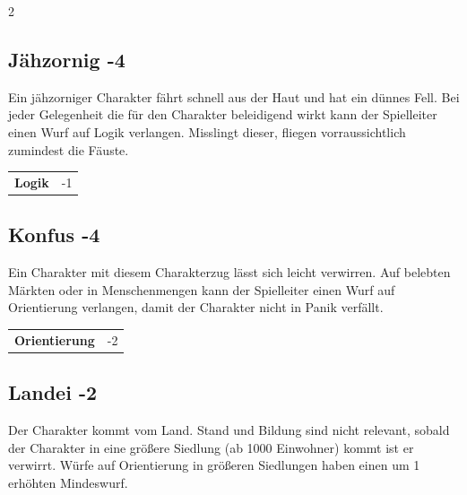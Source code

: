 \begin{multicols}{2}
\begin{tcolorbox}
    \subsection*{Jähzornig \hfill \small{-4 }}
    \tcblower
Ein jähzorniger Charakter fährt schnell aus der Haut und hat ein dünnes Fell. Bei jeder Gelegenheit die für den Charakter beleidigend wirkt kann der Spielleiter einen Wurf auf Logik verlangen. Misslingt dieser, fliegen vorraussichtlich zumindest die Fäuste.


\vspace{3mm}

\begin{tabular}{@{}ll@{}}
    \textbf{Logik} & -1\\
\end{tabular}


\end{tcolorbox}

\begin{tcolorbox}
    \subsection*{Konfus \hfill \small{-4 }}
    \tcblower
Ein Charakter mit diesem Charakterzug lässt sich leicht verwirren. Auf belebten Märkten oder in Menschenmengen kann der Spielleiter einen Wurf auf Orientierung verlangen, damit der Charakter nicht in Panik verfällt.


\vspace{3mm}

\begin{tabular}{@{}ll@{}}
    \textbf{Orientierung} & -2\\
\end{tabular}


\end{tcolorbox}

\begin{tcolorbox}
    \subsection*{Landei \hfill \small{-2 }}
    \tcblower
Der Charakter kommt vom Land. Stand und Bildung sind nicht relevant, sobald der Charakter in eine größere Siedlung (ab 1000 Einwohner) kommt ist er verwirrt. Würfe auf Orientierung in größeren Siedlungen haben einen um 1 erhöhten Mindeswurf.



\end{tcolorbox}
\end{multicols}
